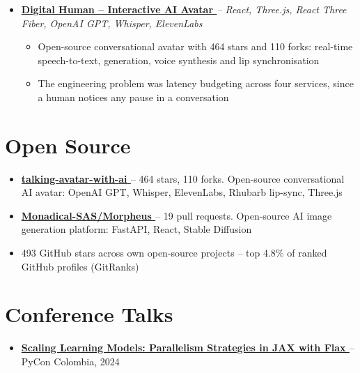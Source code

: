 \documentclass[letterpaper,10pt]{article}
\newcommand{\normalfaExternalLink}{{\mdseries\faExternalLink}}
\newcommand{\normalfaYoutube}{{\mdseries\faYoutube}}
\begin{document}
\begin{itemize}[leftmargin=*, itemsep=2pt]
\begin{itemize}[itemsep=0pt]
    \end{itemize}
    \item \textbf{\href{https://github.com/asanchezyali/talking-avatar-with-ai}{Digital Human -- Interactive AI Avatar \normalfaExternalLink}} \textit{-- React, Three.js, React Three Fiber, OpenAI GPT, Whisper, ElevenLabs}
    \begin{itemize}[itemsep=0pt]
        \item Open-source conversational avatar with 464 stars and 110 forks: real-time speech-to-text, generation, voice synthesis and lip synchronisation
        \item The engineering problem was latency budgeting across four services, since a human notices any pause in a conversation
    \end{itemize}
\end{itemize}

\section{Open Source}
\begin{itemize}[leftmargin=*, itemsep=0pt]
    \item \textbf{\href{https://github.com/asanchezyali/talking-avatar-with-ai}{talking-avatar-with-ai \normalfaExternalLink}} -- 464 stars, 110 forks. Open-source conversational AI avatar: OpenAI GPT, Whisper, ElevenLabs, Rhubarb lip-sync, Three.js
    \item \textbf{\href{https://github.com/Monadical-SAS/Morpheus}{Monadical-SAS/Morpheus \normalfaExternalLink}} -- 19 pull requests. Open-source AI image generation platform: FastAPI, React, Stable Diffusion
    \item 493 GitHub stars across own open-source projects -- top 4.8\% of ranked GitHub profiles (GitRanks)
\end{itemize}

\section{Conference Talks}
\begin{itemize}[leftmargin=*, itemsep=0pt]
    \item \textbf{\href{https://www.youtube.com/watch?v=m4hP1soE414}{Scaling Learning Models: Parallelism Strategies in JAX with Flax \normalfaYoutube}} -- PyCon Colombia, 2024
\end{itemize}
\end{document}
